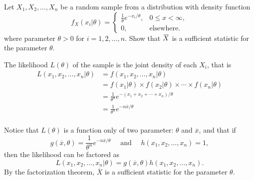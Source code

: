 \begin{example}
    Let $X_1, X_2, \ldots, X_n$ be a random sample from a distribution with density function
    \[
        f_X(x_i|\theta) = \begin{cases}
            \displaystyle \frac{1}{\theta}e^{-x_i / \theta}, & 0 \leq x < \infty,\\
            0, & \text{elsewhere}.
        \end{cases}
    \]
    where parameter $\theta > 0$ for $i = 1, 2, \ldots, n$. Show that 
    $\ols{X}$ is a sufficient statistic for the parameter $\theta$.
\end{example}
\begin{solution}
    The likelihood $L(\theta)$ of the sample is the joint density of each $X_i$, that is 
    \begin{align*}
        L(x_1, x_2, \ldots, x_n | \theta) &= f(x_1, x_2, \ldots, x_n | \theta)\\
        &= f(x_1 | \theta) \times f(x_2 | \theta) \times \cdots \times f(x_n | \theta)\\
        &= \frac{1}{\theta^n} e^{-(x_1 + x_2 + \cdots + x_n)/\theta}\\
        &= \frac{1}{\theta^n} e^{-n \overline{x}/\theta}\\
    \end{align*}

    Notice that $L(\theta)$ is a function only of two parameter: $\theta$ and $\overline{x}$, and that if
    \[
        g(\overline{x}, \theta) = \frac{1}{\theta^n} e^{-n \overline{x}/\theta} \quad \text{ and } \quad h(x_1, x_2, \ldots, x_n) = 1,
    \]
    then the likelihood can be factored as
    \[
        L(x_1, x_2, \ldots, x_n | \theta) = g(\overline{x}, \theta) h(x_1, x_2, \ldots, x_n).
    \]
    By the factorization theorem, $\overline{X}$ is a sufficient statistic for the parameter $\theta$.
\end{solution}

